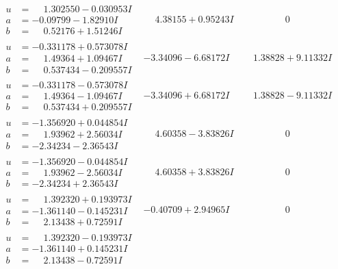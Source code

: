 \documentclass[1p]{elsarticle_modified}
\theoremstyle{definition}
\begin{document}
$$\begin{array}{c|c|c}
\begin{aligned}
u &= \phantom{-}1.302550 - 0.030953 I \\
a &= -0.09799 - 1.82910 I \\
b &= \phantom{-}0.52176 + 1.51246 I\end{aligned}
 & \phantom{-}4.38155 + 0.95243 I & \phantom{-0.000000 } 0 \\ \hline\begin{aligned}
u &= -0.331178 + 0.573078 I \\
a &= \phantom{-}1.49364 + 1.09467 I \\
b &= \phantom{-}0.537434 - 0.209557 I\end{aligned}
 & -3.34096 - 6.68172 I & \phantom{-}1.38828 + 9.11332 I \\ \hline\begin{aligned}
u &= -0.331178 - 0.573078 I \\
a &= \phantom{-}1.49364 - 1.09467 I \\
b &= \phantom{-}0.537434 + 0.209557 I\end{aligned}
 & -3.34096 + 6.68172 I & \phantom{-}1.38828 - 9.11332 I \\ \hline\begin{aligned}
u &= -1.356920 + 0.044854 I \\
a &= \phantom{-}1.93962 + 2.56034 I \\
b &= -2.34234 - 2.36543 I\end{aligned}
 & \phantom{-}4.60358 - 3.83826 I & \phantom{-0.000000 } 0 \\ \hline\begin{aligned}
u &= -1.356920 - 0.044854 I \\
a &= \phantom{-}1.93962 - 2.56034 I \\
b &= -2.34234 + 2.36543 I\end{aligned}
 & \phantom{-}4.60358 + 3.83826 I & \phantom{-0.000000 } 0 \\ \hline\begin{aligned}
u &= \phantom{-}1.392320 + 0.193973 I \\
a &= -1.361140 - 0.145231 I \\
b &= \phantom{-}2.13438 + 0.72591 I\end{aligned}
 & -0.40709 + 2.94965 I & \phantom{-0.000000 } 0 \\ \hline\begin{aligned}
u &= \phantom{-}1.392320 - 0.193973 I \\
a &= -1.361140 + 0.145231 I \\
b &= \phantom{-}2.13438 - 0.72591 I\end{aligned}

\end{array}$$
\end{document}
